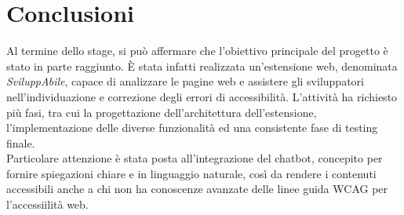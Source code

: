 \chapter{Conclusioni}
\label{chap:conclusioni}
\noindent Al termine dello stage, si può affermare che l’obiettivo principale del progetto è stato in parte raggiunto. È stata infatti realizzata un’estensione web, denominata \textit{SviluppAbile}, capace di analizzare le pagine web e assistere gli sviluppatori nell’individuazione e correzione degli errori di accessibilità. L’attività ha richiesto più fasi, tra cui la progettazione dell’architettura dell’estensione, l’implementazione delle diverse funzionalità ed una consistente fase di testing finale. \\Particolare attenzione è stata posta all’integrazione del chatbot, concepito per fornire spiegazioni chiare e in linguaggio naturale, così da rendere i contenuti accessibili anche a chi non ha conoscenze avanzate delle linee guida WCAG per l'accessiilità web.

